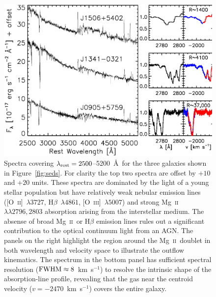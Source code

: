 \documentclass[apj]{emulateapj}
\newcommand{\kms}{km~s$^{-1}$}
\newcommand{\mgii}{\textrm{Mg}~\textsc{ii}}
\newcommand{\oii}{[\textrm{O}~\textsc{ii}]}
\newcommand{\oiii}{[\textrm{O}~\textsc{iii}]}
\newcommand{\lrest}{\lambda_{\textnormal{\scriptsize{rest}}}}
\begin{document}
\begin{figure}[!t]
\includegraphics[angle=0,scale=0.41]{f3.ps}
\caption{Spectra covering $\lrest=2500$--5200~\AA\ for the three
  galaxies shown in Figure~\ref{fig:seds}.  For clarity the top two
  spectra are offset by $+10$ and $+20$ units.  These spectra are
  dominated by the light of a young stellar population but have
  relatively weak nebular emission lines (\oii~$\lambda3727$,
  H$\beta$~$\lambda4861$, \oiii~$\lambda5007$) and strong
  \mgii~$\lambda\lambda2796,2803$ absorption arising from the
  interstellar medium.  The absense of broad \mgii\ or H$\beta$
  emission lines rules out a significant contribution to the optical
  continuum light from an AGN.  The panels on the right highlight the
  region around the \mgii\ doublet in both wavelength and velocity
  space to illustrate the outflow kinematics.  The spectrum in the
  bottom panel has sufficient spectral resolution
  ($\textnormal{FWHM}\approx8$~\kms) to resolve the intrinsic shape of
  the absorption-line profile, revealing that the gas near the
  centroid velocity ($v=-2470$~\kms) covers the entire galaxy.}
\label{fig:spectra}
\end{figure}
\end{document}

